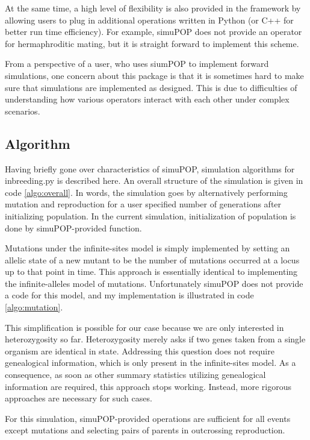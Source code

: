 \documentclass[12pt]{article}
\begin{document}
At the same time, a high level of flexibility is also provided in the
framework by allowing users to plug in additional operations written
in Python (or C++ for better run time efficiency).
For example, simuPOP does not provide an operator for hermaphroditic
mating,
but it is straight forward to implement this scheme.

From a perspective of a user, who uses siumPOP to implement forward
simulations, one concern about this package is that it
is sometimes hard to make sure that simulations are implemented as
designed.
This is due to difficulties of understanding how various operators
interact with each other under complex scenarios.

\subsection{Algorithm}
\label{sec:algorithm}

Having briefly gone over characteristics of simuPOP, simulation
algorithms for inbreeding.py is described here.
An overall structure of the simulation is given in code \ref{algo:overall}.
In words, the simulation goes by alternatively performing
mutation and reproduction for a user specified number of generations
after initializing population.
In the current simulation, initialization of population is done by
simuPOP-provided function.

Mutations under the infinite-sites model is simply implemented by
setting an allelic state of a new mutant to be the number of mutations
occurred at a locus up to that point in time.
This approach is essentially identical to implementing the
infinite-alleles model of mutations.
Unfortunately simuPOP does not provide a code for this model,
and my implementation is illustrated in code \ref{algo:mutation}.

This simplification is possible for our case because we are only
interested in heterozygosity so far.
Heterozygosity merely asks if two genes taken from a single organism
are identical in state.
Addressing this question does not require genealogical information,
which is only present in the infinite-sites model.
As a consequence, as soon as other summary statistics utilizing
genealogical information are required, this approach stops working.
Instead, more rigorous approaches are necessary for such cases.

For this simulation, simuPOP-provided operations are sufficient for
all events except mutations and selecting pairs of parents in
outcrossing reproduction.
\end{document}
